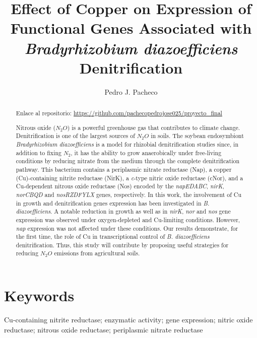 \documentclass[a4paper,11pt]{article}
\title{\textbf{Effect of Copper on Expression of Functional Genes Associated with {\em Bradyrhizobium
diazoefficiens} Denitrification}}
\author{Pedro J. Pacheco}
\date{}
\begin{document}
\maketitle
\begin{abstract}

Enlace al repositorio: 
\url{https://github.com/pachecopedrojose025/proyecto_final}

Nitrous oxide ($N_2O$) is a powerful greenhouse gas that contributes to climate change.
Denitrification is one of the largest sources of $N_2O$ in soils. The soybean endosymbiont {\em Bradyrhizobium
diazoefficiens} is a model for rhizobial denitrification studies since, in addition to fixing $N_2$, it has
the ability to grow anaerobically under free-living conditions by reducing nitrate from the medium
through the complete denitrification pathway. This bacterium contains a periplasmic nitrate reductase
(Nap), a copper (Cu)-containing nitrite reductase (NirK), a {\em c}-type nitric oxide reductase (cNor), and
a Cu-dependent nitrous oxide reductase (Nos) encoded by the {\em napEDABC}, {\em nirK}, {\em norCBQD} and
{\em nosRZDFYLX} genes, respectively. In this work, the involvement of Cu in growth and denitrification genes expression has been investigated in {\em B. diazoefficiens}. A notable reduction in growth as well as in {\em nirK}, {\em nor} and {\em nos} gene expression  was observed
under oxygen-depleted and Cu-limiting conditions. However, {\em nap} expression was not affected under these conditions. Our results demonstrate,
for the first time, the role of Cu in transcriptional control of {\em B. diazoefficiens}
denitrification. Thus, this study will contribute by proposing useful strategies for reducing $N_2O$
emissions from agricultural soils.
\end{abstract}

\section*{Keywords}
Cu-containing nitrite reductase; enzymatic activity; gene expression; nitric oxide
reductase; nitrous oxide reductase; periplasmic nitrate reductase
\end{document}
